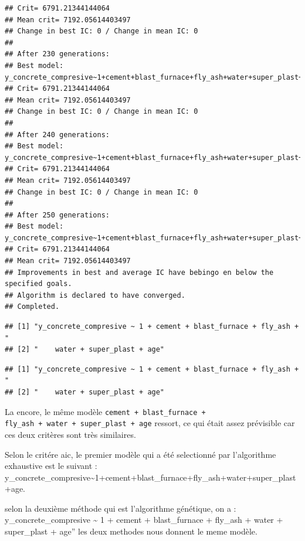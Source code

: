 \documentclass[
  12pt,
]{article}
\begin{document}
\begin{verbatim}
## Crit= 6791.21344144064
## Mean crit= 7192.05614403497
## Change in best IC: 0 / Change in mean IC: 0
## 
## After 230 generations:
## Best model: y_concrete_compresive~1+cement+blast_furnace+fly_ash+water+super_plast+age
## Crit= 6791.21344144064
## Mean crit= 7192.05614403497
## Change in best IC: 0 / Change in mean IC: 0
## 
## After 240 generations:
## Best model: y_concrete_compresive~1+cement+blast_furnace+fly_ash+water+super_plast+age
## Crit= 6791.21344144064
## Mean crit= 7192.05614403497
## Change in best IC: 0 / Change in mean IC: 0
## 
## After 250 generations:
## Best model: y_concrete_compresive~1+cement+blast_furnace+fly_ash+water+super_plast+age
## Crit= 6791.21344144064
## Mean crit= 7192.05614403497
## Improvements in best and average IC have bebingo en below the specified goals.
## Algorithm is declared to have converged.
## Completed.
\end{verbatim}

\begin{verbatim}
## [1] "y_concrete_compresive ~ 1 + cement + blast_furnace + fly_ash + "
## [2] "    water + super_plast + age"
\end{verbatim}

\begin{verbatim}
## [1] "y_concrete_compresive ~ 1 + cement + blast_furnace + fly_ash + "
## [2] "    water + super_plast + age"
\end{verbatim}

La encore, le même modèle \texttt{cement\ +\ blast\_furnace\ +}
\texttt{fly\_ash\ +\ water\ +\ super\_plast\ +\ age} ressort, ce qui
était assez prévisible car ces deux critères sont très similaires.

Selon le critére aic, le premier modèle qui a été selectionné par
l'algorithme exhaustive est le suivant :
y\_concrete\_compresive\textasciitilde1+cement+blast\_furnace+fly\_ash+water+super\_plast+age.

selon la deuxième méthode qui est l'algorithme génétique, on a :
y\_concrete\_compresive \textasciitilde{} 1 + cement + blast\_furnace +
fly\_ash + water + super\_plast + age'' les deux methodes nous donnent
le meme modèle.
\end{document}
